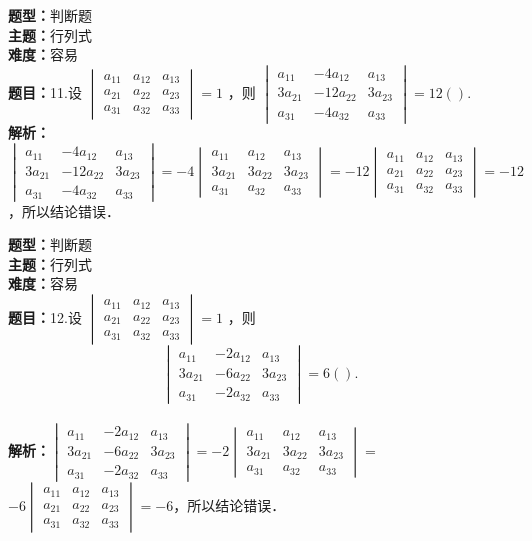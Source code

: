 \documentclass{ctexart}
\newenvironment{question}[5]{%
	\noindent\textbf{题型：}#1\\
	\textbf{主题：}#2\\
	\textbf{难度：}#3\\
	\textbf{题目：}#4\\
	\textbf{解析：}#5\\
	\vspace{1em}
}{}
\begin{document}
	
	\begin{question}
		{判断题}
		{行列式}
		{容易}
		{11.设 \(\begin{vmatrix}a_{11} & a_{12} & a_{13} \\ a_{21} & a_{22} & a_{23} \\ a_{31} & a_{32} & a_{33}\end{vmatrix}=1\) ，则 \(\begin{vmatrix}a_{11} & -4 a_{12} & a_{13} \\ 3 a_{21} & -12 a_{22} & 3 a_{23} \\ a_{31} & -4 a_{32} & a_{33}\end{vmatrix}=12(  ).\)}
		{\(\begin{vmatrix}a_{11} & -4 a_{12} & a_{13} \\ 3 a_{21} & -12 a_{22} & 3 a_{23} \\ a_{31} & -4 a_{32} & a_{33}\end{vmatrix}=-4\begin{vmatrix}a_{11} & a_{12} & a_{13} \\ 3 a_{21} & 3 a_{22} & 3 a_{23} \\ a_{31} & a_{32} & a_{33}\end{vmatrix}=-12\begin{vmatrix}a_{11} & a_{12} & a_{13} \\ a_{21} & a_{22} & a_{23} \\ a_{31} & a_{32} & a_{33}\end{vmatrix}=-12\)，所以结论错误．}
	\end{question}
	
	\begin{question}
		{判断题}
		{行列式}
		{容易}
		{12.设 \(\begin{vmatrix}a_{11} & a_{12} & a_{13} \\ a_{21} & a_{22} & a_{23} \\ a_{31} & a_{32} & a_{33}\end{vmatrix}=1\) ，则
			\[
			\begin{vmatrix}
				a_{11} & -2 a_{12} & a_{13} \\
				3 a_{21} & -6 a_{22} & 3 a_{23} \\
				a_{31} & -2 a_{32} & a_{33}
			\end{vmatrix}=6(  ).
			\]
		}
		{\(\begin{vmatrix}a_{11} & -2 a_{12} & a_{13} \\ 3 a_{21} & -6 a_{22} & 3 a_{23} \\ a_{31} & -2 a_{32} & a_{33}\end{vmatrix}=-2\begin{vmatrix}a_{11} & a_{12} & a_{13} \\ 3 a_{21} & 3 a_{22} & 3 a_{23} \\ a_{31} & a_{32} & a_{33}\end{vmatrix}=\) \(-6\begin{vmatrix}a_{11} & a_{12} & a_{13} \\ a_{21} & a_{22} & a_{23} \\ a_{31} & a_{32} & a_{33}\end{vmatrix}=-6\)，所以结论错误．}
	\end{question}
	
\end{document}
